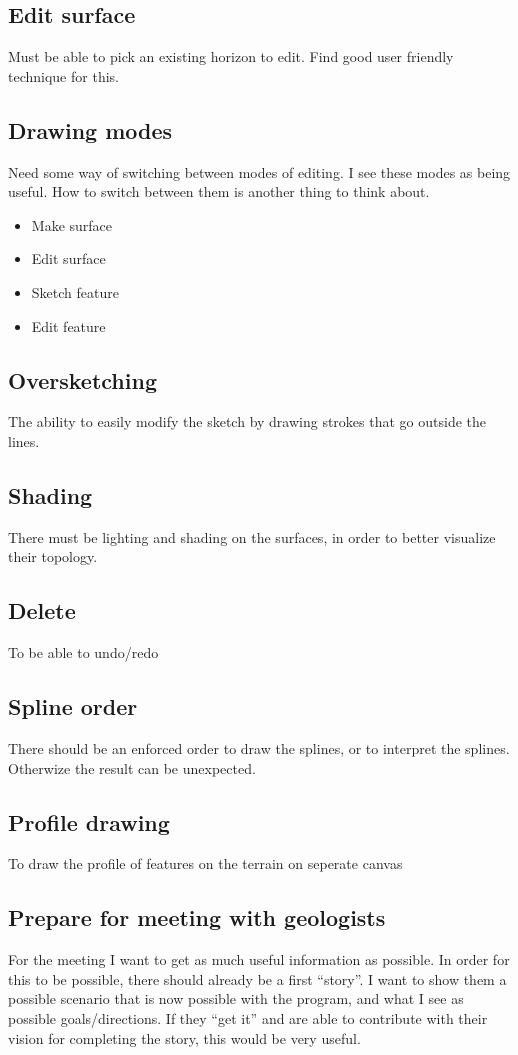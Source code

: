 \documentclass[a4paper,10pt]{article}
\begin{document}
\subsection{Edit surface}
Must be able to pick an existing horizon to edit. Find good user friendly technique for this.
\subsection{Drawing modes}
Need some way of switching between modes of editing. I see these modes as being useful. How to switch between them is another thing to think about.
\begin{itemize}
 \item Make surface
 \item Edit surface
 \item Sketch feature
 \item Edit feature
\end{itemize}
\subsection{Oversketching}
The ability to easily modify the sketch by drawing strokes that go outside the lines. 
\subsection{Shading}
There must be lighting and shading on the surfaces, in order to better visualize their topology.
\subsection{Delete}
To be able to undo/redo
\subsection{Spline order}
There should be an enforced order to draw the splines, or to interpret the splines. Otherwize the result can be unexpected.
\subsection{Profile drawing}
To draw the profile of features on the terrain on seperate canvas
\subsection{Prepare for meeting with geologists}
For the meeting I want to get as much useful information as possible. In order for this to be possible, there should already be a first ``story''. I want to show them a possible scenario that is now possible with the program, and what I see as possible goals/directions. If they ``get it'' and are able to contribute with their vision for completing the story, this would be very useful.
\end{document}
